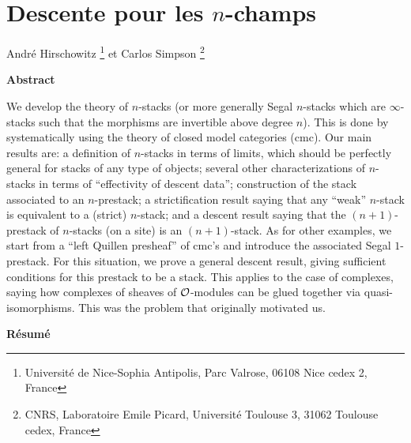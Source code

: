 \documentclass[12pt]{article}
\newcommand{\Oo}{{\cal O}}
\begin{document}
\section*{Descente pour les $n$-champs}

Andr\'e Hirschowitz
\footnote{
Universit\'e de Nice-Sophia Antipolis, Parc Valrose,
06108 Nice cedex 2, France}
et
Carlos Simpson
\footnote{
CNRS, Laboratoire Emile Picard, Universit\'e Toulouse 3, 31062 Toulouse cedex,
France}


\begin{center}
{\bf Abstract}
\end{center}

We develop the theory of $n$-stacks (or more generally Segal $n$-stacks
which are $\infty$-stacks such that the morphisms are invertible above
degree $n$). This is done by systematically using the theory of
closed  model categories (cmc). Our main results are: a definition of
$n$-stacks in terms of limits,  which should be perfectly general for stacks
of any type of objects;  several other characterizations of $n$-stacks in
terms of ``effectivity of descent data''; construction of the stack
associated to an $n$-prestack; a strictification result saying that
any ``weak'' $n$-stack is equivalent to a (strict) $n$-stack; and a
descent result saying that the $(n+1)$-prestack of $n$-stacks (on a
site) is an $(n+1)$-stack. As for other examples, we start from a
``left Quillen presheaf'' of cmc's and introduce the associated
Segal $1$-prestack. For this situation, we prove a general descent result,
giving sufficient conditions for this prestack to be a stack.
This applies to the case of complexes, saying how complexes of
sheaves of $\Oo$-modules can be glued together via quasi-isomorphisms.
This was the problem that originally motivated us.



\begin{center}
{\bf R\'esum\'e}
\end{center}
\end{document}
